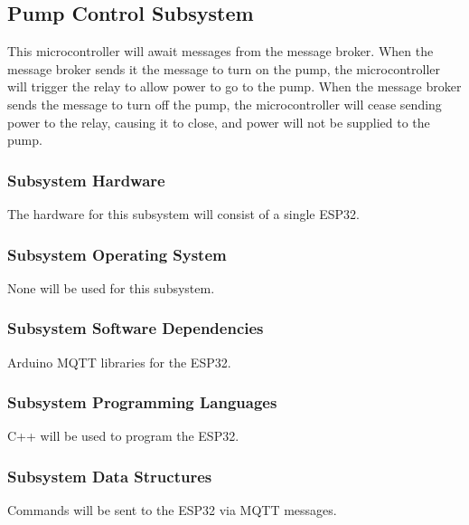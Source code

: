 \subsection{Pump Control Subsystem}
This microcontroller will await messages from the message broker. When the
message broker sends it the message to turn on the pump, the microcontroller
will trigger the relay to allow power to go to the pump. When the message broker
sends the message to turn off the pump, the microcontroller will cease sending
power to the relay, causing it to close, and power will not be supplied to the
pump.

\subsubsection{Subsystem Hardware}
The hardware for this subsystem will consist of a single ESP32.

\subsubsection{Subsystem Operating System}
None will be used for this subsystem. 

\subsubsection{Subsystem Software Dependencies}
Arduino MQTT libraries for the ESP32.

\subsubsection{Subsystem Programming Languages}
C++ will be used to program the ESP32.

\subsubsection{Subsystem Data Structures}
Commands will be sent to the ESP32 via MQTT messages. 
